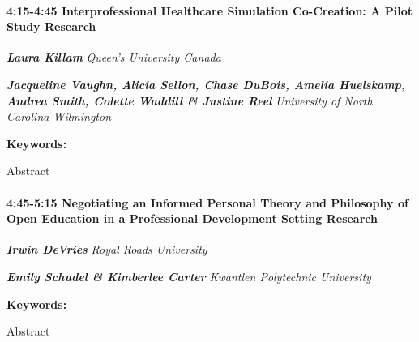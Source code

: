 \documentclass[
]{book}
\begin{document}
\begin{session}
\hypertarget{interprofessional-healthcare-simulation-co-creation-a-pilot-study-research}{%
\paragraph*{\texorpdfstring{4:15-4:45 \textbar{}
\textbf{Interprofessional Healthcare Simulation Co-Creation: A Pilot
Study} \textbar{}
Research}{4:15-4:45 \textbar{} Interprofessional Healthcare Simulation Co-Creation: A Pilot Study \textbar{} Research}}\label{interprofessional-healthcare-simulation-co-creation-a-pilot-study-research}}

\textbf{\emph{Laura Killam}} \textbar{} \emph{Queen's University Canada}

\textbf{\emph{Jacqueline Vaughn, Alicia Sellon, Chase DuBois, Amelia
Huelskamp, Andrea Smith, Colette Waddill \& Justine Reel}} \textbar{}
\emph{University of North Carolina Wilmington}

\textbf{Keywords:}

Abstract
\end{session}

\begin{session}
\hypertarget{negotiating-an-informed-personal-theory-and-philosophy-of-open-education-in-a-professional-development-setting-research}{%
\paragraph*{\texorpdfstring{4:45-5:15 \textbar{} \textbf{Negotiating an
Informed Personal Theory and Philosophy of Open Education in a
Professional Development Setting} \textbar{}
Research}{4:45-5:15 \textbar{} Negotiating an Informed Personal Theory and Philosophy of Open Education in a Professional Development Setting \textbar{} Research}}\label{negotiating-an-informed-personal-theory-and-philosophy-of-open-education-in-a-professional-development-setting-research}}

\textbf{\emph{Irwin DeVries}} \textbar{} \emph{Royal Roads University}

\textbf{\emph{Emily Schudel \& Kimberlee Carter}} \textbar{}
\emph{Kwantlen Polytechnic University}

\textbf{Keywords:}

Abstract
\end{session}
\end{document}
